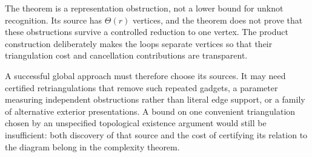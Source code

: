 The theorem is a representation obstruction, not a lower bound for
unknot recognition. Its source has $\Theta(r)$ vertices, and the theorem
does not prove that these obstructions survive a controlled reduction to
one vertex. The product construction deliberately makes the loops
separate vertices so that their triangulation cost and cancellation
contributions are transparent.

A successful global approach must therefore choose its sources. It may
need certified retriangulations that remove such repeated gadgets, a
parameter measuring independent obstructions rather than literal edge
support, or a family of alternative exterior presentations. A bound on
one convenient triangulation chosen by an unspecified topological
existence argument would still be insufficient: both discovery of that
source and the cost of certifying its relation to the diagram belong in
the complexity theorem.
